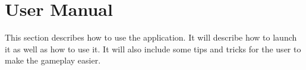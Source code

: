 \section{User Manual}
This section describes how to use the application. 
It will describe how to launch it as well as how to use it.
It will also include some tips and tricks for the user to make the gameplay easier.








